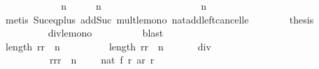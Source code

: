 \begin{isabellebody}
\ \ \ \ \isamarkupfalse%
{\isacharminus}\isanewline
\ \ \ \ \ \ \isamarkupfalse%
\ {\isachardoublequoteopen}n\ {\isacharasterisk}\ {\isacharparenleft}{}\ {\isacharasterisk}\ {}{}{}{}\ {\isacharplus}\ n\ {\isacharplus}\ {}{\isacharparenright}\ {\isasymge}\ {}{}{}{}\ {\isacharasterisk}\ {\isacharparenleft}{}{\isacharasterisk}{}{}{}{}\ {\isacharplus}\ {}{}{}{}\ {\isacharplus}\ {}{\isacharparenright}{\isachardoublequoteclose}\isanewline
\ \ \ \ \ \ \ \ \isamarkupfalse%
\ {\isacharbackquoteopen}n\ {\isasymge}\ {}{}{}{}{\isacharbackquoteclose}\isanewline
\ \ \ \ \ \ \ \ \isamarkupfalse%
\ {\isacharparenleft}metis\ Suc{\isacharunderscore}eq{\isacharunderscore}plus{}\ add{\isacharunderscore}Suc\ mult{\isacharunderscore}le{\isacharunderscore}mono\ nat{\isacharunderscore}add{\isacharunderscore}left{\isacharunderscore}cancel{\isacharunderscore}le{\isacharparenright}\isanewline
\ \ \ \ \ \ \isamarkupfalse%
\ {\isacharquery}thesis\isanewline
\ \ \ \ \ \ \ \ \isamarkupfalse%
\ div{\isacharunderscore}le{\isacharunderscore}mono\isanewline
\ \ \ \ \ \ \ \ \isamarkupfalse%
\ blast\isanewline
\ \ \ \ \isamarkupfalse%
\isanewline
\isanewline
\ \ \ \ \isamarkupfalse%
\isanewline
\isanewline
\ \ \ \ \isamarkupfalse%
\ {\isachardoublequoteopen}length\ {\isacharbrackleft}r{}{\isachardot}{\isachardot}{\isacharless}{\isacharparenleft}r{}\ {\isacharplus}\ n\ {\isacharminus}\ {}{\isacharparenright}\ {\isacharplus}\ {}{\isacharbrackright}\ {\isacharasterisk}\ {\isacharparenleft}{}\ {\isacharasterisk}\ {}{}{}{}\ {\isacharplus}\ length\ {\isacharbrackleft}r{}{\isachardot}{\isachardot}{\isacharless}{\isacharparenleft}r{}\ {\isacharplus}\ n\ {\isacharminus}\ {}{\isacharparenright}\ {\isacharplus}\ {}{\isacharbrackright}\ {\isacharplus}\ {}{\isacharparenright}\ div\ {}\ {\isasymle}\ \isanewline
\ \ \ \ \ \ \ \ \ \ {\isacharparenleft}{\isasymSum}r{\isacharprime}{\isasymleftarrow}{\isacharbrackleft}r{}{\isachardot}{\isachardot}{\isacharless}{\isacharparenleft}r{}\ {\isacharplus}\ n\ {\isacharminus}\ {}{\isacharparenright}\ {\isacharplus}\ {}{\isacharbrackright}{\isachardot}\ nat\ {\isacharparenleft}f\ r{\isacharprime}\ {\isacharparenleft}ar\ r{\isacharprime}{\isacharparenright}{\isacharparenright}{\isacharparenright}{\isachardoublequoteclose}\isanewline

\end{isabellebody}
